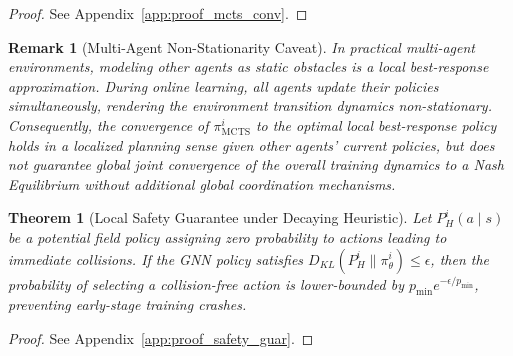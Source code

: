 \documentclass[11pt,a4paper]{article}
\newtheorem{theorem}{Theorem}
\newtheorem{remark}{Remark}
\begin{document}
\begin{proof}
See Appendix~\ref{app:proof_mcts_conv}.
\end{proof}

\begin{remark}[Multi-Agent Non-Stationarity Caveat]
In practical multi-agent environments, modeling other agents as static obstacles is a local best-response approximation. During online learning, all agents update their policies simultaneously, rendering the environment transition dynamics non-stationary. Consequently, the convergence of $\pi_{\mathrm{MCTS}}^i$ to the optimal local best-response policy holds in a localized planning sense given other agents' current policies, but does not guarantee global joint convergence of the overall training dynamics to a Nash Equilibrium without additional global coordination mechanisms.
\end{remark}

\begin{theorem}[Local Safety Guarantee under Decaying Heuristic]\label{thm:safety_guar}
Let $P_H^i(a \mid s)$ be a potential field policy assigning zero probability to actions leading to immediate collisions. If the GNN policy satisfies $D_{KL}(P_H^i \parallel \pi_\theta^i) \leq \epsilon$, then the probability of selecting a collision-free action is lower-bounded by $p_{\min} e^{-\epsilon/p_{\min}}$, preventing early-stage training crashes.
\end{theorem}

\begin{proof}
See Appendix~\ref{app:proof_safety_guar}.
\end{proof}
\end{document}
